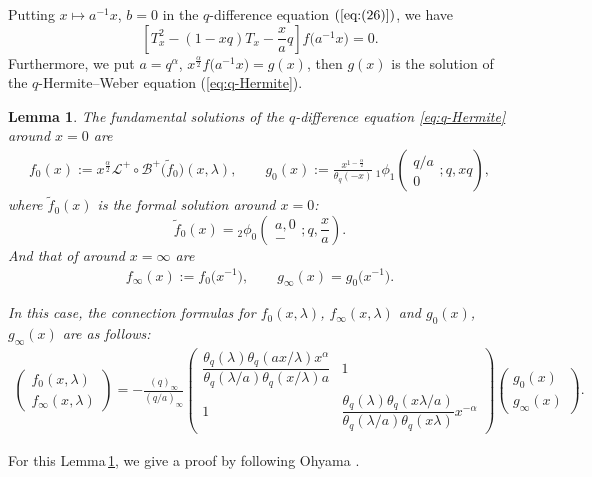 \documentclass[pdftex]{sigma}
\numberwithin{equation}{section}
\newtheorem{lem}[thm]{Lemma}
\theoremstyle{definition}
\begin{document}
Putting $x\mapsto a^{-1}x$, $b=0$ in the $q$-difference equation $(\ref{eq:(26)})$, we have
\[
\left[T_x^2-(1-xq)T_x-\frac{x}{a}q\right]f\big(a^{-1}x\big)=0.
\]
Furthermore, we put $a=q^{\alpha }$, $x^\frac{\alpha}{2}f\big(a^{-1}x\big)=g(x)$, then $g(x)$ is the solution of the $q$-Hermite--Weber equation (\ref{eq:q-Hermite}).
\begin{lem}\label{lem:lemma2}
The fundamental solutions of the $q$-difference equation \eqref{eq:q-Hermite} around $x=0$ are
\begin{gather*}
f_{0}(x)
 :=
 x^{\frac{\alpha }{2}}\mathcal{L}^{+}\circ\mathcal{B}^{+}\big(\widetilde{f}_{0}\big)(x,\lambda), \qquad
g_0(x)
 :=
 \frac{x^{1-\frac{\alpha}{2}}}{\theta_q(-x)}\,{}_1\phi_1\left(\begin{matrix}q/a\\0 \end{matrix};q,xq\right),
\end{gather*}
where $\widetilde{f}_{0}(x)$ is the formal solution around $x=0$:
\[
\widetilde{f}_{0}(x)
 =
 {}_2\phi_0\left(\begin{matrix}a,0 \\ - \end{matrix};q, {\frac{x}{a}}\right).
\]
And that of around $x=\infty$ are
\begin{gather*}
f_{\infty }(x)
 :=
 f_{0 }\big(x^{-1}\big), \qquad
g_{\infty }(x)
 =g_0\big(x^{-1}\big).
\end{gather*}

In this case, the connection formulas for $f_0(x,\lambda)$, $f_{\infty }(x,\lambda)$ and $g_0(x)$, $g_\infty(x)$ are as follows:
\begin{align}
\label{amuconnect}
\begin{pmatrix}f_0(x,\lambda)\\ f_{\infty }(x,\lambda) \end{pmatrix}=-\frac{(q)_\infty}{(q/a)_\infty}\begin{pmatrix}\dfrac{\theta_q(\lambda)\theta_q(ax/\lambda)x^\alpha}{\theta_q(\lambda/a)\theta_q(x/\lambda)a}&1 \\ 1&\dfrac{\theta_q(\lambda)\theta_q(x\lambda/a)}{\theta_q(\lambda/a)\theta_q(x\lambda)}x^{-\alpha}\end{pmatrix}\begin{pmatrix}g_0(x)\\g_\infty(x)\end{pmatrix}.
\end{align}
\end{lem}
For this Lemma\,\ref{lem:lemma2}, we give a proof by following Ohyama \cite{O2}.
\end{document}
